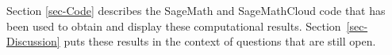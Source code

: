 \documentclass[12pt,a4paper]{article}
\begin{document}
Section \ref{sec-Code} describes the SageMath and Sage\-Math\-Cloud code that has been used to obtain
and display these computational results.
Section~\ref{sec-Discussion} puts these results in the context of questions that are still open.
%
%
%
%
%
%
%
%
%
%
%

\end{document}
